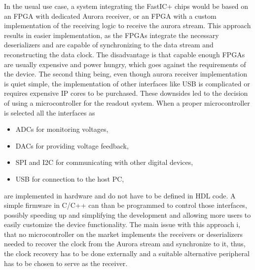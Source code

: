\documentclass{cernatsnote}
\begin{document}
In the usual use case, a system integrating the FastIC+ chips would be based on an FPGA with dedicated Aurora receiver, or an FPGA with a custom implementation of the receiving logic to receive the aurora stream. This approach results in easier implementation, as the FPGAs integrate the necessary deserializers and are capable of synchronizing to the data stream and reconstructing the data clock. The disadvantage is that capable enough FPGAs are usually expensive and power hungry, which goes against the requirements of the device. The second thing being, even though aurora receiver implementation is quiet simple, the implementation of other interfaces like USB is complicated or requires expensive IP cores to be purchased. These downsides led to the decision of using a microcontroller for the readout system. 
When a proper microcontroller is selected all the interfaces as
\begin{itemize}
    \item ADCs for monitoring voltages,
    \item DACs for providing voltage feedback,
    \item SPI and I2C for communicating with other digital devices,
    \item USB for connection to the host PC,
\end{itemize}
are implemented in hardware and do not have to be defined in HDL code. A simple firmware in C/C++ can than be programmed to control those interfaces, possibly speeding up and simplifying the development and allowing more users to easily customize the device functionality. The main issue with this approach i, that no microcontroller on the market implements the receivers or deserializers needed to recover the clock from the Aurora stream and synchronize to it, thus, the clock recovery has to be done externally and a suitable alternative peripheral has to be chosen to serve as the receiver.
\end{document}
